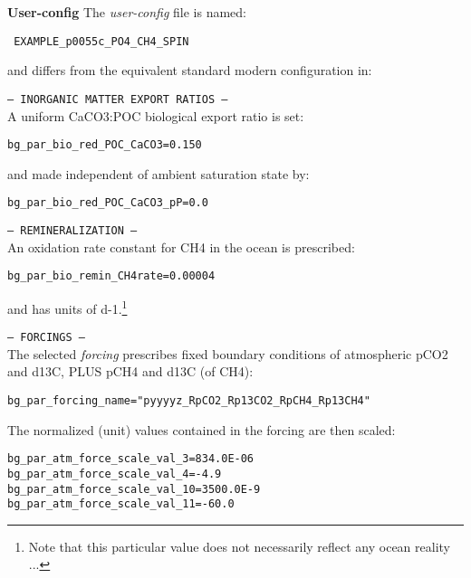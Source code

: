 \documentclass[10pt,twoside]{article}
\begin{document}
\noindent \textbf{User-config} The \textit{user-config} file is named:
\vspace{-10pt}\begin{verbatim} EXAMPLE_p0055c_PO4_CH4_SPIN \end{verbatim}\vspace{-10pt}
and differs from the equivalent standard modern configuration in:
\begin{compactitem}
		\item \texttt{--- INORGANIC MATTER EXPORT RATIOS ---}
		\\ A uniform CaCO3:POC biological export ratio is set:
\vspace{-5pt}\begin{verbatim}bg_par_bio_red_POC_CaCO3=0.150\end{verbatim}\vspace{-5pt}
and made independent of ambient saturation state by:
\vspace{-5pt}\begin{verbatim}bg_par_bio_red_POC_CaCO3_pP=0.0\end{verbatim}\vspace{-5pt}
	\item \texttt{--- REMINERALIZATION ---}
	\\ An oxidation rate constant for CH4 in the ocean is prescribed:
\vspace{-5pt}\begin{verbatim}bg_par_bio_remin_CH4rate=0.00004\end{verbatim}\vspace{-5pt}
and has units of d-1.\footnote{Note that this particular value does not necessarily reflect any ocean reality ...}
		\item \texttt{--- FORCINGS ---}
	\\ The selected \textit{forcing} prescribes fixed boundary conditions of atmospheric pCO2 and d13C, PLUS pCH4 and d13C (of CH4):
\vspace{-5pt}\begin{verbatim}bg_par_forcing_name="pyyyyz_RpCO2_Rp13CO2_RpCH4_Rp13CH4"\end{verbatim}\vspace{-5pt}
	The normalized (unit) values contained in the forcing are then scaled:
	\vspace{-5pt}\begin{verbatim}
bg_par_atm_force_scale_val_3=834.0E-06
bg_par_atm_force_scale_val_4=-4.9
bg_par_atm_force_scale_val_10=3500.0E-9
bg_par_atm_force_scale_val_11=-60.0
		\end{verbatim}\vspace{-5pt}

\end{compactitem}
\end{document}
